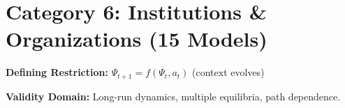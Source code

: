\section{Category 6: Institutions \& Organizations (15 Models)}
\label{sec:ms-institutions}

\begin{tcolorbox}[colback=gray!5!white, colframe=gray!75!black,
    title=\textbf{Institutions: The Endogenous Context Extension}]

\textbf{Defining Restriction:} $\Psi_{t+1} = f(\Psi_t, a_t)$ (context evolves)

\textbf{Validity Domain:} Long-run dynamics, multiple equilibria,
path dependence.

\end{tcolorbox}

